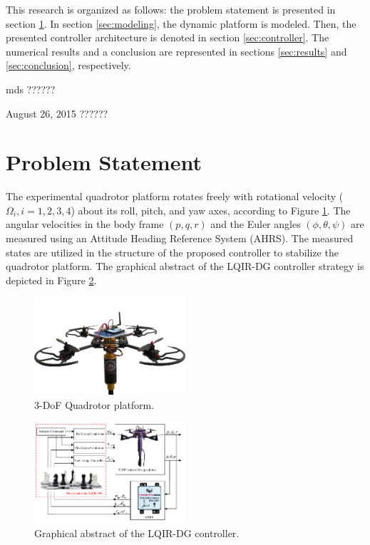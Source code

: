 \documentclass[peerreview]{IEEEtran}
\begin{document}
This research is organized as follows: the problem statement is presented in section \ref{sec:problem}. In section \ref{sec:modeling}, the dynamic
platform is modeled. Then, the presented controller architecture is denoted in section \ref{sec:controller}. The numerical results and a conclusion are represented in sections \ref{sec:results} and
\ref{sec:conclusion}, respectively.

\hfill mds ??????
 
\hfill August 26, 2015 ??????

\section{Problem Statement}\label{sec:problem}
\noindent The experimental quadrotor platform rotates freely with rotational velocity ($\Omega_i, i = 1, 2, 3, 4$) about its roll, pitch, and yaw axes, according to Figure \ref{fig:quadrotor}.
The angular velocities in the body frame $(p, q, r)$ and the Euler angles $(\phi, \theta, \psi)$ are measured using an Attitude Heading Reference System (AHRS).
The measured states are utilized in the structure of the proposed controller to stabilize the quadrotor platform.
The graphical abstract of the LQIR-DG controller strategy is depicted in Figure \ref{fig:blockdiagram}.

\begin{figure}[H]
  \centering
  \includegraphics[width=0.5\textwidth]{../Figure/3DOFQuad.png}
  \caption{3-DoF Quadrotor platform.}
  \label{fig:quadrotor}
\end{figure}

\begin{figure}[H]
  \centering
  \includegraphics[width=0.5\textwidth]{../Figure/schematic.pdf}
  \caption{Graphical abstract of the LQIR-DG controller.}
  \label{fig:blockdiagram}
\end{figure}
\end{document}
